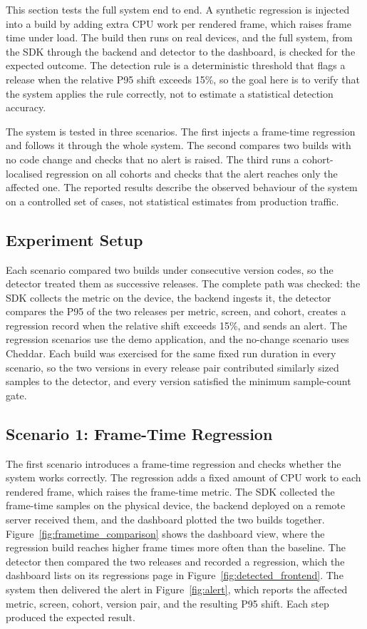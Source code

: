 This section tests the full system end to end. A synthetic regression is injected into a build by adding extra CPU work per rendered frame, which raises frame time under load. The build then runs on real devices, and the full system, from the SDK through the backend and detector to the dashboard, is checked for the expected outcome. The detection rule is a deterministic threshold that flags a release when the relative P95 shift exceeds 15\%, so the goal here is to verify that the system applies the rule correctly, not to estimate a statistical detection accuracy.

The system is tested in three scenarios. The first injects a frame-time regression and follows it through the whole system. The second compares two builds with no code change and checks that no alert is raised. The third runs a cohort-localised regression on all cohorts and checks that the alert reaches only the affected one. The reported results describe the observed behaviour of the system on a controlled set of cases, not statistical estimates from production traffic.

\subsection{Experiment Setup}

Each scenario compared two builds under consecutive version codes, so the detector treated them as successive releases. The complete path was checked: the SDK collects the metric on the device, the backend ingests it, the detector compares the P95 of the two releases per metric, screen, and cohort, creates a regression record when the relative shift exceeds 15\%, and sends an alert. The regression scenarios use the demo application, and the no-change scenario uses Cheddar. Each build was exercised for the same fixed run duration in every scenario, so the two versions in every release pair contributed similarly sized samples to the detector, and every version satisfied the minimum sample-count gate. %

\subsection{Scenario 1: Frame-Time Regression}

The first scenario introduces a frame-time regression and checks whether the system works correctly. The regression adds a fixed amount of CPU work to each rendered frame, which raises the frame-time metric. The SDK collected the frame-time samples on the physical device, the backend deployed on a remote server received them, and the dashboard plotted the two builds together. Figure~\ref{fig:frametime_comparison} shows the dashboard view, where the regression build reaches higher frame times more often than the baseline. The detector then compared the two releases and recorded a regression, which the dashboard lists on its regressions page in Figure~\ref{fig:detected_frontend}. The system then delivered the alert in Figure~\ref{fig:alert}, which reports the affected metric, screen, cohort, version pair, and the resulting P95 shift. Each step produced the expected result.


